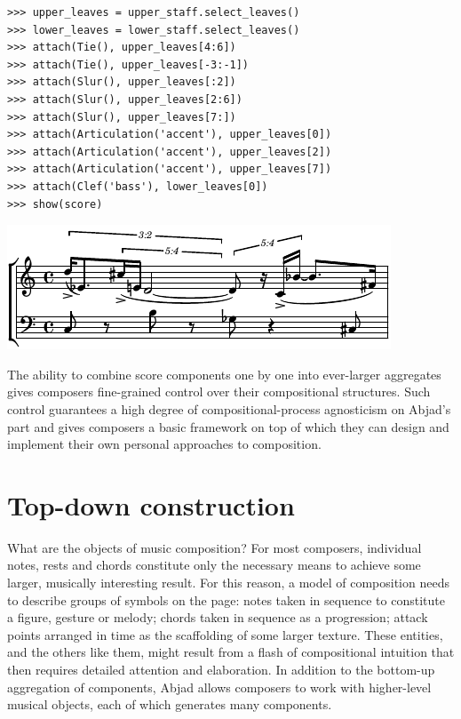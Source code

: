 \documentclass{article}
\begin{document}
\begin{lstlisting}
>>> upper_leaves = upper_staff.select_leaves()
>>> lower_leaves = lower_staff.select_leaves()
>>> attach(Tie(), upper_leaves[4:6])
>>> attach(Tie(), upper_leaves[-3:-1])
>>> attach(Slur(), upper_leaves[:2])
>>> attach(Slur(), upper_leaves[2:6])
>>> attach(Slur(), upper_leaves[7:])
>>> attach(Articulation('accent'), upper_leaves[0])
>>> attach(Articulation('accent'), upper_leaves[2])
>>> attach(Articulation('accent'), upper_leaves[7])
>>> attach(Clef('bass'), lower_leaves[0])
>>> show(score)
\end{lstlisting}
\includegraphics{assets/lilypond-19c9fd0f2ed858d81b6840584a4e0cc8.pdf}

\noindent The ability to combine score components one by one into ever-larger
aggregates gives composers fine-grained control over their compositional
structures. Such control guarantees a high degree of compositional-process
agnosticism on Abjad's part and gives composers a basic framework on top of
which they can design and implement their own personal approaches to
composition.

\section{Top-down construction} \label{sec:top-down}

What are the objects of music composition? For most composers, individual
notes, rests and chords constitute  only the necessary means to achieve some
larger, musically interesting result. For this reason, a model of composition needs to describe
groups of symbols on the page: notes taken in sequence to constitute a figure,
gesture or melody; chords taken in sequence as a progression; attack points
arranged in time as the scaffolding of some larger texture. These entities, and
the others like them, might result from a flash of compositional intuition that
then requires detailed attention and elaboration. In addition to the bottom-up
aggregation of components, Abjad allows composers to work with higher-level
musical objects, each of which generates many components.
\end{document}
